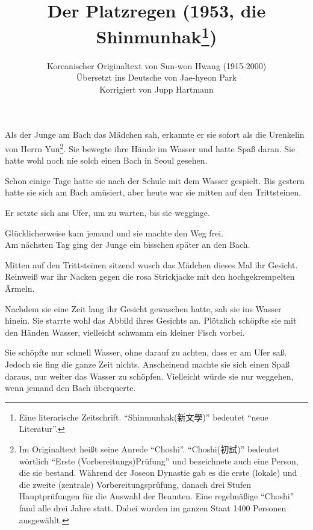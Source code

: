 \documentclass[prd,a4paper,12pt,tightenlines,notitlepage,nofootinbib]{revtex4-1}
\begin{document}
\title{Der Platzregen (1953, die Shinmunhak\footnote{
Eine literarische Zeitschrift.
"`Shinmunhak({新文學})"' bedeutet
"`neue Literatur"'.
})}
\author{Koreanischer Originaltext von Sun-won Hwang (1915-2000)
\\ Übersetzt ins Deutsche von Jae-hyeon Park
\\ Korrigiert von Jupp Hartmann}
\maketitle

\noindent
Als der Junge am Bach das Mädchen sah, erkannte er sie sofort als die
Urenkelin von Herrn Yun\footnote{Im Originaltext heißt seine Anrede "`Choshi"'.
"`Choshi({初試})"' bedeutet wörtlich "`Erste (Vorbereitungs)Prüfung"' und
bezeichnete auch eine Person, die sie bestand.
Während der Joseon Dynastie gab es
die erste (lokale) und die zweite (zentrale) Vorbereitungsprüfung,
danach drei Stufen Hauptprüfungen für die Auswahl der Beamten.
Eine regelmäßige "`Choshi"' fand alle drei Jahre statt. Dabei wurden
im ganzen Staat 1400 Personen ausgewählt.}.
Sie bewegte ihre Hände im Wasser und hatte
Spaß daran.  Sie hatte wohl noch nie solch einen Bach in Seoul gesehen.

Schon einige Tage hatte sie nach der Schule mit dem Wasser gespielt.
Bis gestern hatte sie sich am Bach amüsiert,
aber heute war sie mitten auf den Trittsteinen.

Er setzte sich ans Ufer, um zu warten, bis sie wegginge.

Glücklicherweise kam
jemand und sie machte den Weg frei.
\\

Am nächsten Tag ging der Junge ein bisschen später an den Bach.

Mitten auf den Trittsteinen sitzend wusch das Mädchen dieses Mal ihr
Gesicht.  Reinweiß war ihr Nacken gegen die rosa
Strickjacke mit den hochgekrempelten Ärmeln.

Nachdem sie eine Zeit lang
ihr Gesicht gewaschen hatte, sah sie ins Wasser hinein.  Sie starrte wohl das
Abbild ihres Gesichts an.  Plötzlich schöpfte sie mit den Händen
Wasser, vielleicht schwamm ein kleiner Fisch vorbei.

Sie schöpfte nur schnell
Wasser, ohne darauf zu achten, dass er am Ufer saß.  Jedoch sie fing
die ganze Zeit nichts.  Anscheinend machte sie sich einen Spaß daraus,
nur weiter das Wasser zu schöpfen.  Vielleicht würde sie nur weggehen,
wenn jemand den Bach überquerte.
\end{document}
